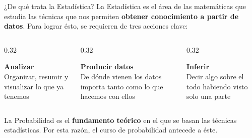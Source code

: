 \documentclass[aspectratio=169,10pt]{beamer}
\newcommand{\destaca}[1]{%
  \par\vspace{3pt}\noindent
  \colorbox{azulClaro}{%
    \parbox{\dimexpr\linewidth-2\fboxsep\relax}{\vspace{3pt}#1\vspace{3pt}}}%
  \par\vspace{3pt}}
\begin{document}
\begin{frame}{¿De qué trata la Estadística?}
  La Estadística es el área de las matemáticas que estudia las técnicas que nos permiten \textbf{obtener conocimiento a partir de datos}. Para lograr ésto, se requieren de tres acciones clave:
  \vspace{0.5cm}
  \begin{columns}[T]
    \begin{column}{0.32\textwidth}
      \destaca{\centering\textbf{Analizar}\\[3pt]
      {\small Organizar, resumir y visualizar lo que ya tenemos}}
    \end{column}
    \begin{column}{0.32\textwidth}
      \destaca{\centering\textbf{Producir datos}\\[3pt]
      {\small De dónde vienen los datos importa tanto como lo que hacemos con ellos}}
    \end{column}
    \begin{column}{0.32\textwidth}
      \destaca{\centering\textbf{Inferir}\\[3pt]
      {\small Decir algo sobre el todo habiendo visto solo una parte}}
    \end{column}
  \end{columns}
\vspace{5mm}
La Probabilidad es el \textbf{fundamento teórico} en el que se basan las técnicas estadísticas. Por esta razón, el curso de probabilidad antecede a éste.
\end{frame}
\end{document}

